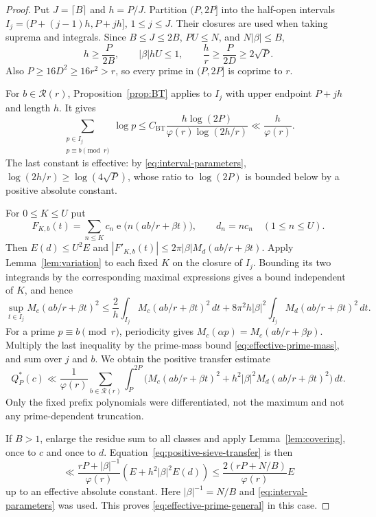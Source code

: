 \documentclass[10pt,a4paper]{amsart}
\newcommand{\e}{\operatorname{e}}
\begin{document}
\begin{proof}
Put $J=\lceil B\rceil$ and $h=P/J$. Partition $(P,2P]$ into the
half-open intervals
$I_j=(P+(j-1)h,P+jh]$, $1\le j\le J$.
Their closures are used when taking suprema and integrals. Since
$B\le J\le2B$, $PU\le N$, and $N|\beta|\le B$,
\begin{equation}\label{eq:interval-parameters}
 h\ge\frac{P}{2B},\qquad |\beta|hU\le1,\qquad
 \frac h r\ge\frac{P}{2D}\ge2\sqrt P.
\end{equation}
Also $P\ge16D^2\ge16r^2>r$, so every prime in $(P,2P]$ is
coprime to $r$.

For $b\in\mathcal R(r)$, Proposition~\ref{prop:BT} applies to $I_j$
with upper endpoint $P+jh$ and length $h$. It gives
\begin{equation}\label{eq:effective-prime-mass}
 \sum_{\substack{p\in I_j\\p\equiv b\pmod r}}\log p
 \le C_\mathrm{BT}\frac{h\log(2P)}{\varphi(r)\log(2h/r)}
 \ll\frac h{\varphi(r)}.
\end{equation}
The last constant is effective: by \eqref{eq:interval-parameters},
$\log(2h/r)\ge\log(4\sqrt P)$, whose ratio to $\log(2P)$ is bounded
below by a positive absolute constant.

For $0\le K\le U$ put
\[
 F_{K,b}(t)=\sum_{n\le K}c_n\e\bigl(n(ab/r+\beta t)\bigr),
 \qquad d_n=nc_n\quad(1\le n\le U).
\]
Then $E(d)\le U^2E$ and
$|F'_{K,b}(t)|\le2\pi|\beta|M_d(ab/r+\beta t)$.
Apply Lemma~\ref{lem:variation} to each fixed $K$ on the closure of
$I_j$. Bounding its two integrands by the corresponding maximal
expressions gives a bound independent of $K$, and hence
\[
 \sup_{t\in I_j}M_c(ab/r+\beta t)^2
 \le\frac2h\int_{I_j}M_c(ab/r+\beta t)^2\,dt
 +8\pi^2h|\beta|^2\int_{I_j}M_d(ab/r+\beta t)^2\,dt.
\]
For a prime $p\equiv b\pmod r$, periodicity gives
$M_c(\alpha p)=M_c(ab/r+\beta p)$.
Multiply the last inequality by the prime-mass bound
\eqref{eq:effective-prime-mass}, and sum over $j$ and $b$.
We obtain the positive transfer estimate
\begin{equation}\label{eq:positive-sieve-transfer}
 Q_P^*(c)\ll\frac1{\varphi(r)}\sum_{b\in\mathcal R(r)}
 \int_P^{2P}\big(M_c(ab/r+\beta t)^2
   +h^2|\beta|^2 M_d(ab/r+\beta t)^2\big)\,dt.
\end{equation}
Only the fixed prefix polynomials were differentiated, not the maximum
and not any prime-dependent truncation.

If $B>1$, enlarge the residue sum to all classes and apply
Lemma~\ref{lem:covering}, once to $c$ and once to $d$.
Equation~\eqref{eq:positive-sieve-transfer} is then
\[
 \ll\frac{rP+|\beta|^{-1}}{\varphi(r)}
                  (E+h^2|\beta|^2E(d))
 \le\frac{2(rP+N/B)}{\varphi(r)}E
\]
up to an effective absolute constant. Here
$|\beta|^{-1}=N/B$ and \eqref{eq:interval-parameters} was used.
This proves \eqref{eq:effective-prime-general} in this case.


\end{proof}
\end{document}
